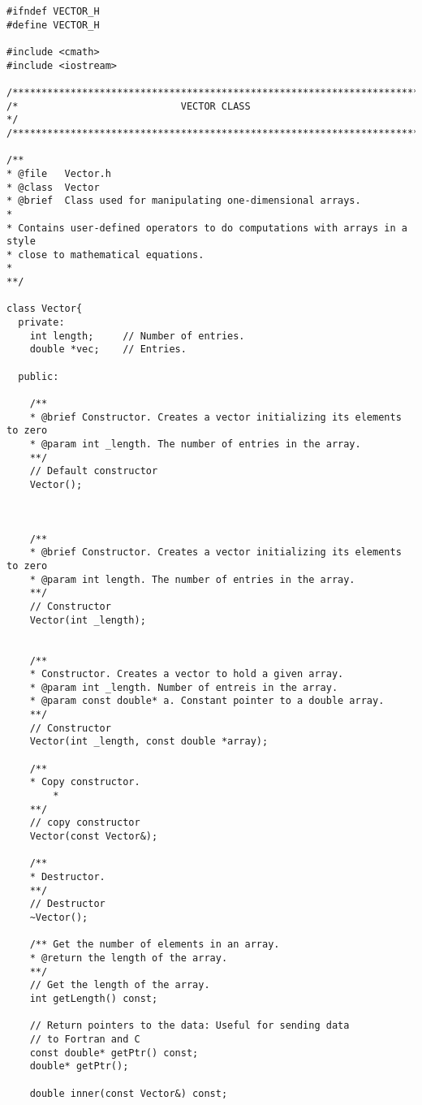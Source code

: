 \begin{lstlisting}[title={\url{http://folk.uio.no/mhjensen/compphys/programs/chapter03/cpp/Vector.h}}]
#ifndef VECTOR_H
#define VECTOR_H

#include <cmath>
#include <iostream>

/*****************************************************************************/
/*                            VECTOR CLASS                                   */
/*****************************************************************************/

/**
* @file   Vector.h
* @class  Vector
* @brief  Class used for manipulating one-dimensional arrays.
*
* Contains user-defined operators to do computations with arrays in a style 
* close to mathematical equations.
*
**/

class Vector{
  private:
    int length;     // Number of entries.
    double *vec;    // Entries.
    
  public:
    
    /**
    * @brief Constructor. Creates a vector initializing its elements to zero
    * @param int _length. The number of entries in the array.
    **/
    // Default constructor
    Vector();
    
    
    
    /**
    * @brief Constructor. Creates a vector initializing its elements to zero
    * @param int length. The number of entries in the array.
    **/
    // Constructor
    Vector(int _length);          
    
    
    /**
    * Constructor. Creates a vector to hold a given array.
    * @param int _length. Number of entreis in the array.
    * @param const double* a. Constant pointer to a double array.
    **/
    // Constructor
    Vector(int _length, const double *array);
    
    /**
    * Copy constructor.
		*
    **/
    // copy constructor
    Vector(const Vector&);        
    
    /**
    * Destructor.
    **/
    // Destructor
    ~Vector();                    
    
    /** Get the number of elements in an array. 
    * @return the length of the array. 
    **/
    // Get the length of the array.
    int getLength() const;
    
    // Return pointers to the data: Useful for sending data 
    // to Fortran and C
    const double* getPtr() const;
    double* getPtr();
    
    double inner(const Vector&) const;
    

\end{lstlisting}
